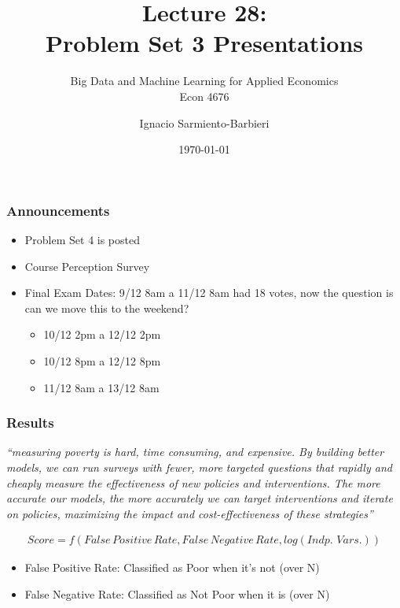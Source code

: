 \documentclass[
  shownotes,
  xcolor={svgnames},
  hyperref={colorlinks,citecolor=DarkBlue,linkcolor=DarkRed,urlcolor=DarkBlue}
  ]{beamer}
\begin{document}
\title[Lecture 28]{Lecture 28: \\ Problem Set 3 Presentations}
\subtitle{Big Data and Machine Learning for Applied Economics \\ Econ 4676}
\date{\today}

\author[Sarmiento-Barbieri]{Ignacio Sarmiento-Barbieri}


\begin{frame}[noframenumbering]
\maketitle
\end{frame}



\begin{frame}
\frametitle{Announcements }


\begin{itemize} 
    \item  Problem Set 4 is posted
    \bigskip
    \item Course Perception Survey
    \bigskip
    \item  Final Exam Dates: 9/12 8am a 11/12 8am had 18 votes, now the question is can we move this to the weekend?
    \bigskip
    \begin{itemize} 
    \item   10/12 2pm a 12/12 2pm
    \bigskip
    \item   10/12 8pm a 12/12 8pm
    \bigskip
    \item   11/12 8am a 13/12 8am
    \end{itemize}
\end{itemize}
\end{frame}
\begin{frame}
\frametitle{Results }

{\it ``measuring poverty is hard, time consuming, and expensive. By building better models, we can run surveys with fewer, more targeted questions that rapidly and cheaply measure the effectiveness of new policies and interventions. The more accurate our models, the more accurately we can target interventions and iterate on policies, maximizing the impact and cost-effectiveness of these strategies''}

\begin{align}
Score = f(False\,Positive\,Rate, False\,Negative\,Rate, log(Indp.\,\,Vars.))
\end{align}

\begin{itemize}
\item False Positive Rate: Classified as Poor when it's not (over N)
\item False Negative Rate: Classified as Not Poor when it is (over N)
\end{itemize}
\end{frame}
\end{document}

